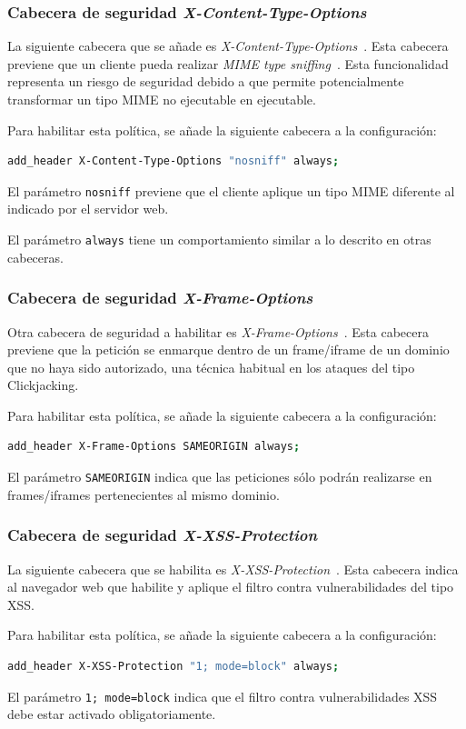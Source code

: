 \subsubsection{Cabecera de seguridad {\em X-Content-Type-Options}}
\par La siguiente cabecera que se añade es {\em X-Content-Type-Options}~\cite{X-Content-Type-Options}. Esta cabecera previene que un cliente pueda realizar {\em MIME type sniffing}~\cite{mimesnif}. Esta funcionalidad representa un riesgo de seguridad debido a que permite potencialmente transformar un tipo MIME no ejecutable en ejecutable.
\par Para habilitar esta política, se añade la siguiente cabecera a la configuración:
\begin{lstlisting}[language=bash]
add_header X-Content-Type-Options "nosniff" always;
\end{lstlisting}
\par El parámetro \lstinline{nosniff} previene que el cliente aplique un tipo MIME diferente al indicado por el servidor web.
\par El parámetro \lstinline{always} tiene un comportamiento similar a lo descrito en otras cabeceras.


\subsubsection{Cabecera de seguridad {\em X-Frame-Options}}
\par Otra cabecera de seguridad a habilitar es {\em X-Frame-Options}~\cite{X-Frame-Options}. Esta cabecera previene que la petición se enmarque dentro de un frame/iframe de un dominio que no haya sido autorizado, una
técnica habitual en los ataques del tipo \gls{Clickjacking}.
\par Para habilitar esta política, se añade la siguiente cabecera a la configuración:
\begin{lstlisting}[language=bash]
add_header X-Frame-Options SAMEORIGIN always;
\end{lstlisting}
\par El parámetro \lstinline{SAMEORIGIN} indica que las peticiones sólo podrán realizarse en frames/iframes pertenecientes al mismo dominio.


\subsubsection{Cabecera de seguridad {\em X-XSS-Protection}}
\par La siguiente cabecera que se habilita es {\em X-XSS-Protection}~\cite{X-XSS-Protection}. Esta cabecera indica al navegador web que habilite y aplique el filtro contra vulnerabilidades del tipo \gls{XSS}.
\par Para habilitar esta política, se añade la siguiente cabecera a la configuración:
\begin{lstlisting}[language=bash]
add_header X-XSS-Protection "1; mode=block" always;
\end{lstlisting}
\par El parámetro \lstinline{1; mode=block} indica que el filtro contra vulnerabilidades XSS debe estar activado obligatoriamente.


